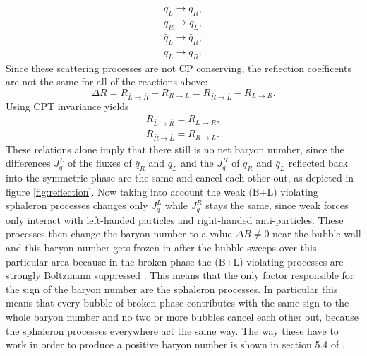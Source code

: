 \begin{align*}
	q_L\rightarrow q_R,\\
	q_R\rightarrow q_L,\\
	\bar{q}_L\rightarrow \bar{q}_R,\\
	\bar{q}_L\rightarrow \bar{q}_R.
\end{align*}
Since these scattering processes are not CP conserving, the reflection coefficents are not the same for all of the reactions above:
\begin{equation}
	\Delta R=R_{\bar{L}\rightarrow\bar{R}}-R_{R\rightarrow L}=R_{\bar{R}\rightarrow\bar{L}}-R_{L\rightarrow R}.
	\label{eq:reflection_coeff}
\end{equation}
Using CPT invariance yields
\begin{align}
	R_{\bar{L}\rightarrow\bar{R}}=R_{L\rightarrow R},\\
	R_{\bar{R}\rightarrow\bar{L}}=R_{R\rightarrow L}.
\end{align}
These relations alone imply that there still is no net baryon number, since the differences $J^L_q$ of the fluxes of $\bar{q}_R$ and $q_L$ and the  $J^R_q$ of $q_R$ and $\bar{q}_L$ reflected back into the symmetric phase are the same and cancel each other out, as depicted in figure \ref{fig:reflection}. Now taking into account the weak (B+L) violating sphaleron processes changes only $J^L_q$ while  $J^R_q$ stays the same, since weak forces only interact with left-handed particles and right-handed anti-particles. These processes then change the baryon number to a value $\Delta B\neq$0 near the bubble wall and this baryon number gets frozen in after the bubble sweeps over this particular area because in the broken phase the (B+L) violating processes are strongly Boltzmann suppressed \cite{Bernreuther:2002uj}. This means that the only factor responsible for the sign of the baryon number are the sphaleron processes. In particular this means that every bubble of broken phase contributes with the same sign to the whole baryon number and no two or more bubbles cancel each other out, because the sphaleron processes everywhere act the same way. The way these have to work in order to produce a positive baryon number is shown in section 5.4 of \cite{Bernreuther:2002uj}.
